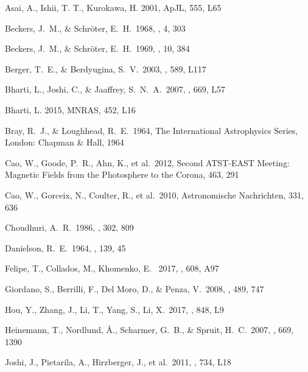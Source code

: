 \documentclass[preprint2]{aastex}
\begin{document}
\begin{thebibliography}{}

Asai, A., Ishii, T. T., Kurokawa, H. 2001, ApJL, 555, L65
%

Beckers, J.~M., \& Schr{\"o}ter, E.~H.\ 1968, \solphys, 4, 303

Beckers, J.~M., \& Schr{\"o}ter, E.~H.\ 1969, \solphys, 10, 384

 Berger, T.~E., \& Berdyugina, S.~V.\ 2003, \apjl, 589, L117

Bharti, L., Joshi, C., \& Jaaffrey, S.~N.~A.\ 2007, \apjl, 669, L57

Bharti, L. 2015, MNRAS, 452, L16
%

Bray, R.~J., \& Loughhead, R.~E.\ 1964, The International Astrophysics Series, London: Chapman \& Hall, 1964

Cao, W., Goode, P.~R., Ahn, K., et al.\ 2012, Second ATST-EAST Meeting: Magnetic Fields from the Photosphere to the Corona, 463, 291

Cao, W., Gorceix, N., Coulter, R., et al.\ 2010, Astronomische Nachrichten, 331, 636

Choudhuri, A.~R.\ 1986, \apj, 302, 809

 Danielson, R.~E.\ 1964, \apj, 139, 45

Felipe, T., Collados, M., Khomenko, E. \ 2017, \aap, 608, A97

Giordano, S., Berrilli, F., Del Moro, D., \& Penza, V.\ 2008, \aap, 489, 747

Hou, Y., Zhang, J., Li, T., Yang, S., Li, X.\ 2017, \apj, 848, L9

Heinemann, T., Nordlund, {\AA}., Scharmer, G.~B., \& Spruit, H.~C.\ 2007, \apj, 669, 1390

Joshi, J., Pietarila, A., Hirzberger, J., et al.\ 2011, \apjl, 734, L18 


\end{thebibliography}
\end{document}
